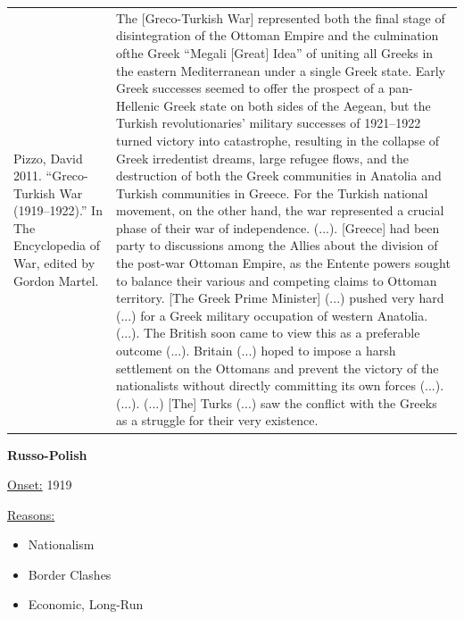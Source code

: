 {\begin{longtable}{p{}p{}}
\\
Pizzo, David 2011. “Greco-Turkish War (1919–1922).” In The Encyclopedia of War, edited by Gordon Martel. & The [Greco-Turkish War] represented both the final stage of disintegration of the Ottoman Empire and the culmination ofthe Greek “Megali [Great] Idea” of uniting all Greeks in the eastern Mediterranean under a single Greek state. Early Greek successes seemed to offer the prospect of a pan-Hellenic Greek state on both sides of the Aegean, but the Turkish revolutionaries' military successes of 1921–1922 turned victory into catastrophe, resulting in the collapse of Greek irredentist dreams, large refugee flows, and the destruction of both the Greek communities in Anatolia and Turkish communities in Greece. For the Turkish national movement, on the other hand, the war represented a crucial phase of their war of independence. (...).
[Greece] had been party to discussions among the Allies about the division of the post-war Ottoman Empire, as the Entente powers sought to balance their various and competing claims to Ottoman territory. [The Greek Prime Minister] (...) pushed very hard (...) for a Greek military occupation of western Anatolia. (...). The British soon came to view this as a preferable outcome (...). Britain (...) hoped to impose a harsh settlement on the Ottomans and prevent the victory of the nationalists without directly committing its own forces (...). (...). (...) [The] Turks (...) saw the conflict with the Greeks as a struggle for their very existence.
\\
\end{longtable}}
\clearpage
         \textbf{Russo-Polish} 

          \underline{Onset:} 1919         

\underline{Reasons:}
\begin{itemize}
\item Nationalism
\item Border Clashes
\item Economic, Long-Run
\end{itemize}

